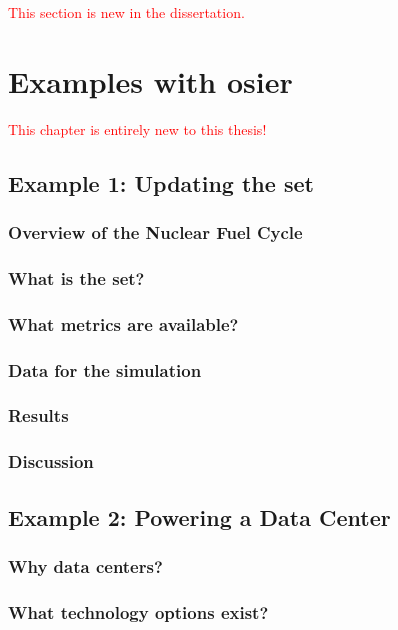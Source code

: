 \textcolor{red}{This section is new in the dissertation.}

\chapter{Examples with \acs{osier}}
\label{chapter:examples}

\textcolor{red}{This chapter is entirely new to this thesis!}

\section{Example 1: Updating the \ac{set}}

\subsection{Overview of the Nuclear Fuel Cycle}

\subsection{What is the \ac{set}?}

\subsection{What metrics are available?}

\subsection{Data for the simulation}

\subsection{Results}

\subsection{Discussion}

\section{Example 2: Powering a Data Center}

\subsection{Why data centers?}

\subsection{What technology options exist?}


